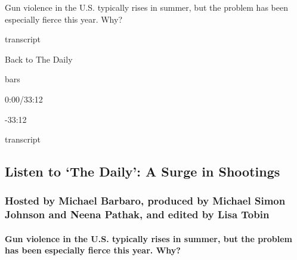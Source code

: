 Gun violence in the U.S. typically rises in summer, but the problem has
been especially fierce this year. Why?

transcript

Back to The Daily

bars

0:00/33:12

-33:12

transcript

\hypertarget{listen-to-the-daily-a-surge-in-shootings-1}{%
\subsection{Listen to `The Daily': A Surge in
Shootings}\label{listen-to-the-daily-a-surge-in-shootings-1}}

\hypertarget{hosted-by-michael-barbaro-produced-by-michael-simon-johnson-and-neena-pathak-and-edited-by-lisa-tobin}{%
\subsubsection{Hosted by Michael Barbaro, produced by Michael Simon
Johnson and Neena Pathak, and edited by Lisa
Tobin}\label{hosted-by-michael-barbaro-produced-by-michael-simon-johnson-and-neena-pathak-and-edited-by-lisa-tobin}}

\hypertarget{gun-violence-in-the-us-typically-rises-in-summer-but-the-problem-has-been-especially-fierce-this-year-why}{%
\paragraph{Gun violence in the U.S. typically rises in summer, but the
problem has been especially fierce this year.
Why?}\label{gun-violence-in-the-us-typically-rises-in-summer-but-the-problem-has-been-especially-fierce-this-year-why}}

